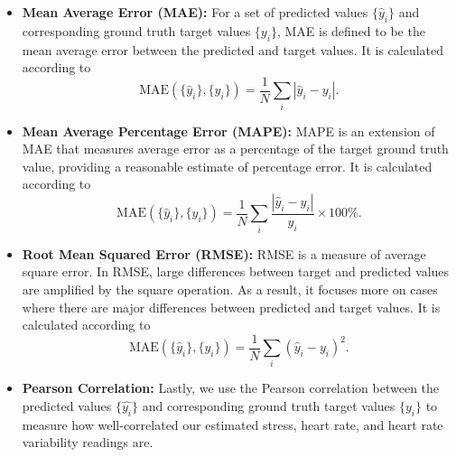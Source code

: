 \documentclass{article}
\begin{document}
\begin{itemize}
    \item \textbf{Mean Average Error (MAE):} For a set of predicted values $\{\hat{y}_i\}$ and corresponding ground truth target values $\{y_i\}$, MAE is defined to be the mean average error between the predicted and target values. It is calculated according to
    \begin{equation}
        \text{MAE}(\{\hat{y}_i\}, \{y_i\}) = \frac{1}{N} \sum_i |\hat{y}_i - y_i|\textit{.}
    \end{equation}
    \item \textbf{Mean Average Percentage Error (MAPE):} MAPE is an extension of MAE that measures average error as a percentage of the target ground truth value, providing a reasonable estimate of percentage error. It is calculated according to
    \begin{equation}
        \text{MAE}(\{\hat{y}_i\}, \{y_i\}) = \frac{1}{N} \sum_i \frac{|\hat{y}_i - y_i|}{y_i} \times 100\% \textit{.}
    \end{equation}
    \item \textbf{Root Mean Squared Error (RMSE):} RMSE is a measure of average square error. In RMSE, large differences between target and predicted values are amplified by the square operation. As a result, it focuses more on cases where there are major differences between predicted and target values. It is calculated according to
    \begin{equation}
        \text{MAE}(\{\hat{y}_i\}, \{y_i\}) = \frac{1}{N} \sum_i (\hat{y}_i - y_i)^2 \textit{.}
    \end{equation}
    \item \textbf{Pearson Correlation:} Lastly, we use the Pearson correlation between the predicted values $\{\hat{y_i}\}$ and corresponding ground truth target values $\{y_i\}$ to measure how well-correlated our estimated stress, heart rate, and heart rate variability readings are.
\end{itemize}
\end{document}
